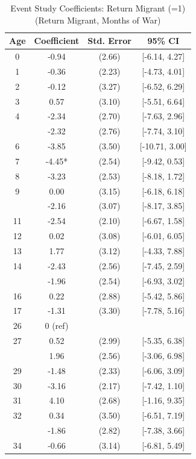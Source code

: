 \begin{table}[!h]
\centering
\caption{\label{tab:event_study_8c_return_migrant_months}Event Study Coefficients: Return Migrant (=1) (Return Migrant, Months of War)}
\centering
\fontsize{9}{11}\selectfont
\begin{threeparttable}
\begin{tabular}[t]{cccc}
\toprule
Age & Coefficient & Std. Error & 95\% CI\\
\midrule
0 & -0.94 & (2.66) & {}[-6.14, 4.27]\\
1 & -0.36 & (2.23) & {}[-4.73, 4.01]\\
2 & -0.12 & (3.27) & {}[-6.52, 6.29]\\
3 & 0.57 & (3.10) & {}[-5.51, 6.64]\\
4 & -2.34 & (2.70) & {}[-7.63, 2.96]\\
\addlinespace
5 & -2.32 & (2.76) & {}[-7.74, 3.10]\\
6 & -3.85 & (3.50) & {}[-10.71, 3.00]\\
7 & -4.45* & (2.54) & {}[-9.42, 0.53]\\
8 & -3.23 & (2.53) & {}[-8.18, 1.72]\\
9 & 0.00 & (3.15) & {}[-6.18, 6.18]\\
\addlinespace
10 & -2.16 & (3.07) & {}[-8.17, 3.85]\\
11 & -2.54 & (2.10) & {}[-6.67, 1.58]\\
12 & 0.02 & (3.08) & {}[-6.01, 6.05]\\
13 & 1.77 & (3.12) & {}[-4.33, 7.88]\\
14 & -2.43 & (2.56) & {}[-7.45, 2.59]\\
\addlinespace
15 & -1.96 & (2.54) & {}[-6.93, 3.02]\\
16 & 0.22 & (2.88) & {}[-5.42, 5.86]\\
17 & -1.31 & (3.30) & {}[-7.78, 5.16]\\
26 & 0 (ref) &  & \\
27 & 0.52 & (2.99) & {}[-5.35, 6.38]\\
\addlinespace
28 & 1.96 & (2.56) & {}[-3.06, 6.98]\\
29 & -1.48 & (2.33) & {}[-6.06, 3.09]\\
30 & -3.16 & (2.17) & {}[-7.42, 1.10]\\
31 & 4.10 & (2.68) & {}[-1.16, 9.35]\\
32 & 0.34 & (3.50) & {}[-6.51, 7.19]\\
\addlinespace
33 & -1.86 & (2.82) & {}[-7.38, 3.66]\\
34 & -0.66 & (3.14) & {}[-6.81, 5.49]\\

\end{tabular}
\end{threeparttable}
\end{table}
